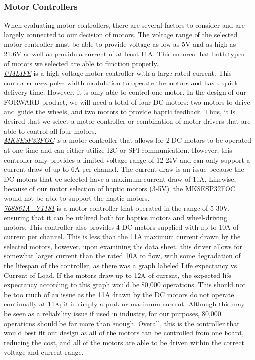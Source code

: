 \subsubsection{Motor Controllers}
\noindent When evaluating motor controllers, there are several factors to consider and are largely connected to our decision of motors. The voltage range of the selected motor controller must be able to provide voltage as low as 5V and as high as 21.6V as well as provide a current of at least 11A. This ensures that both types of motors we selected are able to function properly.\\

\noindent \underline{\textit{UMLIFE}} is a high voltage motor controller with a large rated current. This controller uses pulse width modulation to operate the motors and has a quick delivery time. However, it is only able to control one motor. In the design of our FORWARD product, we will need a total of four DC motors: two motors to drive and guide the wheels, and two motors to provide haptic feedback. Thus, it is desired that we select a motor controller or combination of motor drivers that are able to control all four motors.\\

\noindent \underline{\textit{MKSESP32FOC}} is a motor controller that allows for 2 DC motors to be operated at one time and can either utilize I2C or SPI communication. However, this controller only provides a limited voltage range of 12-24V and can only support a current draw of up to 6A per channel. The current draw is an issue because the DC motors that we selected have a maximum current draw of 11A. Likewise, because of our motor selection of haptic motors (3-5V), the MKSESP32FOC would not be able to support the haptic motors.\\

\noindent \underline{\textit{768861A\_Y1181}} is a motor controller that operated in the range of 5-30V, ensuring that it can be utilized both for haptics motors and wheel-driving motors. This controller also provides 4 DC motors supplied with up to 10A of current per channel. This is less than the 11A maximum current drawn by the selected motors, however, upon examining the data sheet, this driver allows for somewhat larger current than the rated 10A to flow, with some degradation of the lifespan of the controller, as there was a graph labeled Life expectancy vs. Current of Load. If the motors draw up to 12A of current, the expected life expectancy according to this graph would be 80,000 operations. This should not be too much of an issue as the 11A drawn by the DC motors do not operate continually at 11A; it is simply a peak or maximum current. Although this may be seen as a reliability issue if used in industry, for our purposes, 80,000 operations should be far more than enough.  Overall, this is the controller that would best fit our design as all of the motors can be controlled from one board, reducing the cost, and all of the motors are able to be driven within the correct voltage and current range.\\


